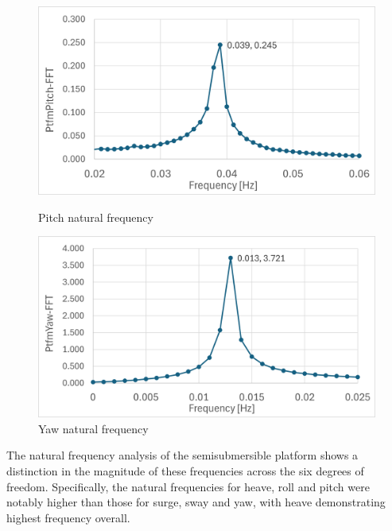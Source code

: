 \documentclass[a4paper]{article}
\begin{document}
\begin{figure}[H]
    \begin{minipage}{0.49\textwidth}
        \centering
        \includegraphics[width=1\textwidth]{nat_freq_pitch.png}
        \caption{\small Pitch natural frequency}
        \label{fig:nat_freq_pitch}
    \end{minipage}
    \hfill
    \begin{minipage}{0.5\textwidth}
        \centering
        \includegraphics[width=1\textwidth]{nat_freq_yaw.png}
        \caption{\small Yaw natural frequency}
        \label{fig:nat_freq_yaw}
    \end{minipage}
\end{figure}

The natural frequency analysis of the semisubmersible platform shows a distinction in the magnitude of these frequencies across the six degrees of freedom. Specifically, the natural frequencies for heave, roll and pitch were notably higher than those for surge, sway and yaw, with heave demonstrating highest frequency overall.
\end{document}
